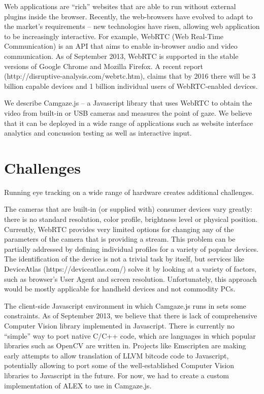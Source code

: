 \documentclass[annual]{acmsiggraph}
\begin{document}
Web applications are “rich” websites that are able to run without external
plugins inside the browser. Recently, the web-browsers have evolved to adapt to
the market’s requirements – new technologies have risen, allowing web
application to be increasingly interactive. For example, WebRTC (Web Real-Time
Communication) is an API that aims to enable in-browser audio and video
communication. As of September 2013, WebRTC is supported in the stable versions
of Google Chrome and Mozilla Firefox. A recent report
(http://disruptive-analysis.com/webrtc.htm), claims that by 2016 there will be
3 billion capable devices and 1 billion individual users of WebRTC-enabled
devices.

We describe Camgaze.js – a Javascript library that uses WebRTC to obtain the
video from built-in or USB cameras and measures the point of gaze. We believe
that it can be deployed in a wide range of applications such as website
interface analytics and concussion testing as well as interactive input.


\section{Challenges}

Running eye tracking on a wide range of hardware creates additional challenges.

The cameras that are built-in (or supplied with) consumer devices vary greatly:
there is no standard resolution, color profile, brightness level or physical
position. Currently, WebRTC provides very limited options for changing any of
the parameters of the camera that is providing a stream. This problem can be
partially addressed by defining individual profiles for a variety of popular
devices. The identification of the device is not a trivial task by itself, but
services like DeviceAtlas (https://deviceatlas.com/) solve it by looking at a
variety of factors, such as browser’s User Agent and screen resolution.
Unfortunately, this approach would be mostly applicable for handheld devices
and not commodity PCs.

The client-side Javascript environment in which Camgaze.js runs in sets some
constraints. As of September 2013, we believe that there is lack of
comprehensive Computer Vision library implemented in Javascript. There is
currently no “simple” way to port native C/C++ code, which are languages in
which popular libraries such as OpenCV are written in. Projects like Emscripten
are making early attempts to allow translation of LLVM bitcode code to
Javascript, potentially allowing to port some of the well-established Computer
Vision libraries to Javascript in the future. For now, we had to create a
custom implementation of {ALEX} to use in Camgaze.js.
\end{document}
